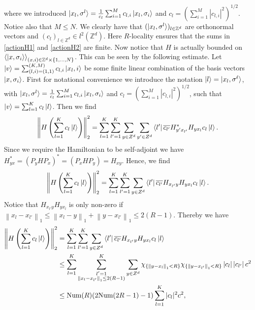 \documentclass[a4paper,11pt]{article}
\newcommand{\norm}[1]{\left\lVert #1 \right\rVert}
\newcommand{\abs}[1]{\left\lvert #1 \right\rvert}
\newcommand{\Z}{\mathbb{Z}}
\numberwithin{equation}{section}
\begin{document}
 	 where we introduced $ \ket{x_l,\sigma^l}=\frac{1}{c_l}\sum_{i=1}^{M}c_{l,i}\ket{x_l,\sigma_i} $ and $ c_l=(\sum_{i=1}^{M}\abs{c_{l,i}}^2)^{1/2} $. Notice also that $ M\leq N $. We clearly have that $ (\ket{x_l,\sigma^l})_{l\in\Z^d} $ are orthonormal vectors and $ (c_l)_{l\in\Z^d}\in l^2(\Z^d) $. Here $ R $-locality ensures that the sums in \eqref{actionH1} and \eqref{actionH2} are finite. Now notice that $ H $ is actually bounded on $ \braket{\ket{x,\sigma_i}}_{(x,i)\in\Z^d\times\{1,...,N\}}  $. This can be seen by the following estimate. Let $ \ket{v}=\sum_{(l,i)=(1,1)}^{(K,M)}c_{l,i}\ket{x_l,i} $ be some finite linear combination of the basis vectors $ \ket{x,\sigma_i} $. First for notational convenience we introduce the notation $ \ket{l}=\ket{x_l,\sigma^\ell}$, with $\ket{x_l,\sigma^l}=\frac{1}{c_l}\sum_{i=1}^{M}c_{l,i}\ket{x_l,\sigma_i} $ and $ c_l=(\sum_{i=1}^{M}\abs{c_{l,i}}^2)^{1/2} $, such that $ \ket{v}=\sum_{l=1}^{K}c_l\ket{l} $. Then we find \begin{equation}
 	 \norm{H\left(\sum_{l=1}^{K}c_l\ket{l}\right)}_2^2=\sum_{l=1}^{K}\sum_{l'=1}^{K}\sum_{y\in Z^d}\sum_{y'\in Z^d}\bra{l'}\overline{c_{l'}}H_{y'x_{l'}}^*H_{yx_l}c_l\ket{l}.
 	 \end{equation}
 	 Since we require the Hamiltonian to be self-adjoint we have $ H_{yx}^*=(P_yHP_x)^*=(P_xHP_y)=H_{xy} $. Hence, we find \begin{equation}
 	  \norm{H\left(\sum_{l=1}^{K}c_l\ket{l}\right)}_2^2=\sum_{l=1}^{K}\sum_{l'=1}^{K}\sum_{y\in Z^d}\bra{l'}\overline{c_{l'}}H_{x_{l'}y}H_{yx_l}c_l\ket{l}.
 	 \end{equation}
 	 Notice that $ H_{x_{l'}y}H_{yx_l} $ is only non-zero if $ \norm{x_l-x_{l'}}_1\leq\norm{x_l-y}_1+\norm{y-x_{l'}}_1\leq2(R-1) $. Thereby we have
 	 \begin{equation}
 	 \begin{aligned}
 	 \norm{H\left(\sum_{l=1}^{K}c_l\ket{l}\right)}_2^2&=\sum_{l=1}^{K}\sum_{l'=1}^{K}\sum_{y\in Z^d}\bra{l'}\overline{c_{l'}}H_{x_{l'}y}H_{yx_l}c_l\ket{l}\\&\leq\sum_{l=1}^{K}\sum_{\substack{l'=1\\\norm{x_l-x_{l'}}_1\leq2(R-1)}}^{K}\sum_{y\in Z^d}\chi_{\{\norm{y-x_l}_1<R\}}\chi_{\{\norm{y-x_{l'}}_1<R\}}\abs{c_l}\abs{c_{l'}}c^2\\&\leq \text{Num}(R)(2\text{Num}(2R-1)-1)\sum_{l=1}^{K} |c_l|^2c^2,
 	 \end{aligned}\label{bound1}
 	 \end{equation}
\end{document}
